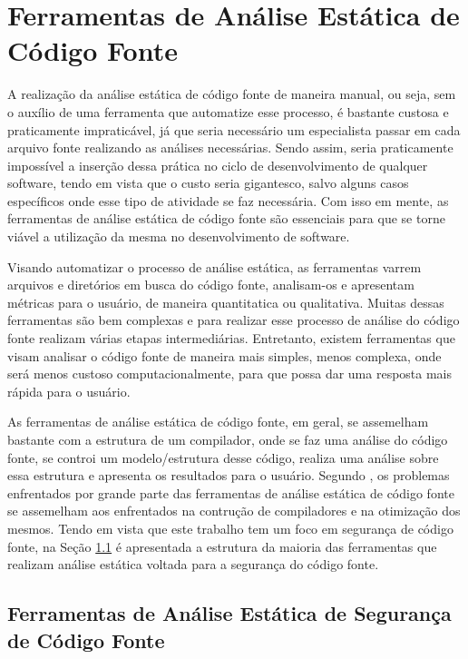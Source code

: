 \chapter{Ferramentas de Análise Estática de Código Fonte}\label{chap:ferramentas}

A realização da análise estática de código fonte de maneira manual, ou seja, sem
o auxílio de uma ferramenta que automatize esse processo, é bastante custosa e
praticamente impraticável, já que seria necessário um especialista passar em
cada arquivo fonte realizando as análises necessárias. Sendo assim, seria
praticamente impossível a inserção dessa prática no ciclo de desenvolvimento de
qualquer software, tendo em vista que o custo seria gigantesco, salvo alguns
casos específicos onde esse tipo de atividade se faz necessária. Com isso em
mente, as ferramentas de análise estática de código fonte são essenciais para
que se torne viável a utilização da mesma no desenvolvimento de software.

Visando automatizar o processo de análise estática, as ferramentas varrem
arquivos e diretórios em busca do código fonte, analisam-os e apresentam
métricas para o usuário, de maneira quantitatica ou qualitativa. Muitas dessas
ferramentas são bem complexas e para realizar esse processo de análise do
código fonte realizam várias etapas intermediárias. Entretanto, existem
ferramentas que visam analisar o código fonte de maneira mais simples, menos
complexa, onde será menos custoso computacionalmente, para que possa dar uma
resposta mais rápida para o usuário.

As ferramentas de análise estática de código fonte, em geral, se assemelham
bastante com a estrutura de um compilador, onde se faz uma análise do código
fonte, se controi um modelo/estrutura desse código, realiza uma análise sobre
essa estrutura e apresenta os resultados para o usuário. Segundo
, os problemas enfrentados por grande parte das
ferramentas de análise estática de código fonte se assemelham aos enfrentados na
contrução de compiladores e na otimização dos mesmos. Tendo em vista que este
trabalho tem um foco em segurança de código fonte, na Seção
\ref{sec:ferramentasseguranca} é apresentada a estrutura da maioria das
ferramentas que realizam análise estática voltada para a segurança do código
fonte.


\section{Ferramentas de Análise Estática de Segurança de Código Fonte}
\label{sec:ferramentasseguranca}

